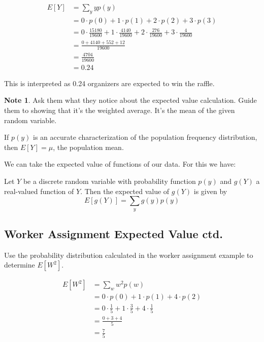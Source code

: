 \documentclass[11pt]{article}
\theoremstyle{definition}
\newtheorem{note}{Note}
\begin{document}
$$
	\begin{aligned}
		E[Y] & = \sum_y yp(y) \\
		& = 0 \cdot p(0) + 1 \cdot p(1) + 2 \cdot p(2) + 3 \cdot p(3) \\
		& = 0 \cdot \frac{15180}{19600} + 1 \cdot \frac{4140}{19600} + 2 \cdot \frac{276}{19600} + 3 \cdot \frac{4}{19600} \\
		& = \frac{0 + 4140 + 552 + 12}{19600} \\
		& = \frac{4704}{19600} \\
		& = 0.24
	\end{aligned}
$$

This is interpreted as 0.24 organizers are expected to win the raffle.

\begin{note}
	Ask them what they notice about the expected value calculation. Guide them to showing that it's the weighted average. It's the mean of the given random variable.
\end{note}

If $p(y)$ is an accurate characterization of the population frequency distribution, then $E[Y]=\mu$, the population mean.

We can take the expected value of functions of our data. For this we have:

\begin{shaded}
	Let $Y$ be a discrete random variable with probability function $p(y)$ and $g(Y)$ a real-valued function of $Y$. Then the expected value of $g(Y)$ is given by
	$$
		E[g(Y)] = \sum_y g(y)p(y)
	$$
\end{shaded}

\subsection{Worker Assignment Expected Value ctd.}

Use the probability distribution calculated in the worker assignment example to determine $E[W^2]$.

$$
	\begin{aligned}
		E[W^2] & = \sum_w w^2p(w) \\
		& = 0 \cdot p(0) + 1 \cdot p(1) + 4 \cdot p(2) \\
		& = 0 \cdot \frac{1}{5} + 1 \cdot \frac{3}{5} + 4 \cdot \frac{1}{5} \\
		& = \frac{0 + 3 + 4}{5} \\
		& = \frac{7}{5}
	\end{aligned}
$$
\end{document}
